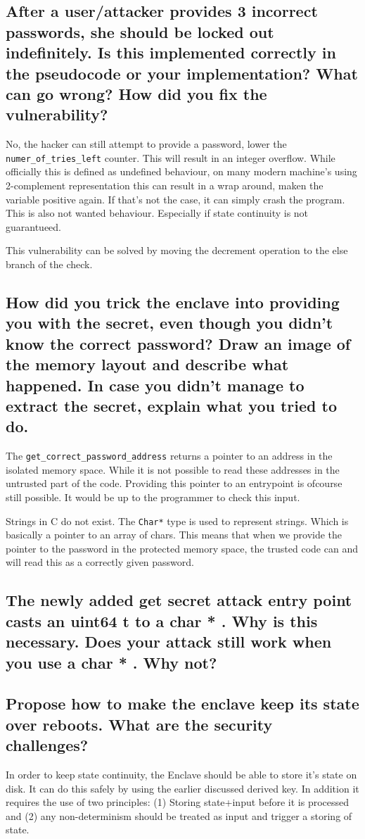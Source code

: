 \documentclass{article}
\begin{document}
\subsection{After a user/attacker provides 3 incorrect passwords, she should be locked
  out indefinitely.  Is this implemented correctly in the pseudocode or your
implementation?  What can go wrong?  How did you fix the vulnerability?}

No, the hacker can still attempt to provide a password, lower the
\texttt{numer\_of\_tries\_left} counter. This will result in an integer
overflow. While officially this is defined as undefined behaviour, on many
modern machine's using 2-complement representation this can result in a wrap
around, maken the variable positive again. If that's not the case, it can simply
crash the program. This is also not wanted behaviour. Especially if state
continuity is not guarantueed.

This vulnerability can be solved by moving the decrement operation to the else
branch of the check.

\subsection{How did you trick the enclave into providing you with the secret, even
  though you didn’t know the correct password?   Draw an image of the
  memory layout and describe what happened.  In case you didn’t manage
to extract the secret, explain what you tried to do.}

The \texttt{get\_correct\_password\_address} returns a pointer to an address in
the isolated memory space. While it is not possible to read these addresses
in the untrusted part of the code. Providing this pointer to an entrypoint is
ofcourse still possible. It would be up to the programmer to check this input. 

Strings in C do not exist. The \texttt{Char*} type is used to represent strings.
Which is basically a pointer to an array of chars. This means that when we
provide the pointer to the password in the protected memory space, the trusted
code can and will read this as a correctly given password.

\subsection{The newly added
  get
  secret
  attack
  entry point casts an
  uint64
  t
  to
  a
  char *
  .  Why is this necessary.  Does your attack still work when you
  use a
  char *
  .  Why not?  }
\subsection{Propose how to make the enclave keep its state over reboots.  What are
the security challenges?}

In order to keep state continuity, the Enclave should be able to store it's
state on disk. It can do this safely by using the earlier discussed derived key.
In addition it requires the use of two principles: (1) Storing state+input before it
is processed and (2) any non-determinism should be treated as input and trigger
a storing of state.
\end{document}

